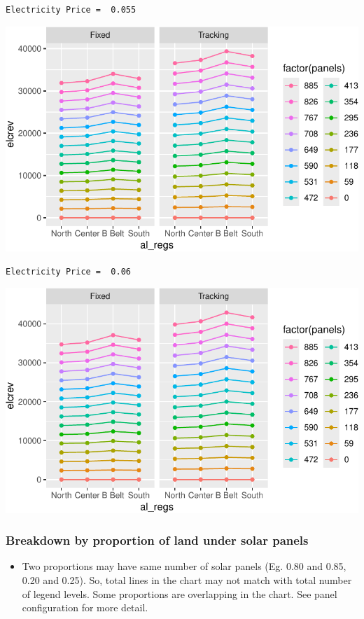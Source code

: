 \documentclass[
  letterpaper,
  DIV=11,
  numbers=noendperiod]{scrartcl}
\providecommand{\tightlist}{%
  \setlength{\itemsep}{0pt}\setlength{\parskip}{0pt}}\usepackage{longtable,booktabs,array}
\begin{document}
\begin{verbatim}
Electricity Price =  0.055
\end{verbatim}

\includegraphics{Simulation_files/figure-pdf/unnamed-chunk-20-10.pdf}

\begin{verbatim}
Electricity Price =  0.06
\end{verbatim}

\includegraphics{Simulation_files/figure-pdf/unnamed-chunk-20-11.pdf}

\subsubsection{Breakdown by proportion of land under solar
panels}\label{breakdown-by-proportion-of-land-under-solar-panels}

\begin{itemize}
\tightlist
\item
  Two proportions may have same number of solar panels (Eg. 0.80 and
  0.85, 0.20 and 0.25). So, total lines in the chart may not match with
  total number of legend levels. Some proportions are overlapping in the
  chart. See panel configuration for more detail.
\end{itemize}
\end{document}
